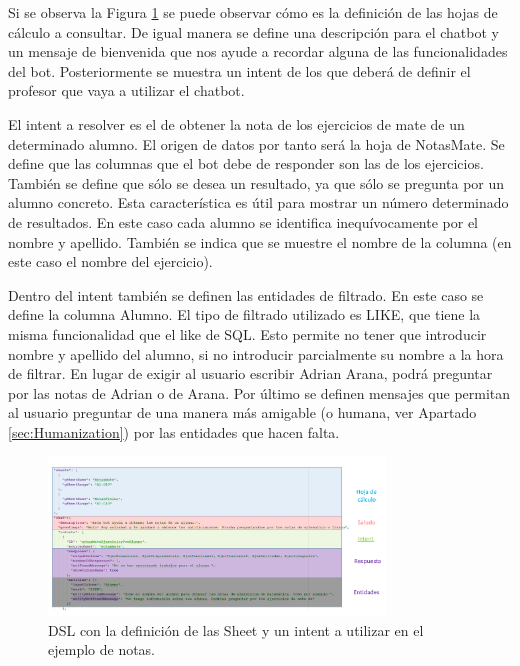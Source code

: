 Si se observa la Figura \ref{fig:DSLNotas} se puede observar cómo es la definición de las hojas de cálculo a consultar. De igual manera se define una descripción para el chatbot y un mensaje de bienvenida que nos ayude a recordar alguna de las funcionalidades del bot. Posteriormente se muestra un intent de los que deberá de definir el profesor que vaya a utilizar el chatbot.

El intent a resolver es el de obtener la nota de los ejercicios de mate de un determinado alumno. El origen de datos por tanto será la hoja de NotasMate. Se define que las columnas que el bot debe de responder son las de los ejercicios. También se define que sólo se desea un resultado, ya que sólo se pregunta por un alumno concreto. Esta característica es útil para mostrar un número determinado de resultados. En este caso cada alumno se identifica inequívocamente por el nombre y apellido. También se indica que se muestre el nombre de la columna (en este caso el nombre del ejercicio).

Dentro del intent también se definen las entidades de filtrado. En este caso se define la columna Alumno. El tipo de filtrado utilizado es LIKE, que tiene la misma funcionalidad que el like de SQL. Esto permite no tener que introducir nombre y apellido del alumno, si no introducir parcialmente su nombre a la hora de filtrar. En lugar de exigir al usuario escribir Adrian Arana, podrá preguntar por las notas de Adrian o de Arana. Por último se definen mensajes que permitan al usuario preguntar de una manera más amigable (o humana, ver Apartado \ref{sec:Humanization}) por las entidades que hacen falta.

\begin{figure}[htb]
	\centering
	\includegraphics[width=0.8\textwidth]{./figs/DSLNotas.png}
	\caption{DSL con la definición de las Sheet y un intent a utilizar en el ejemplo de notas.} %
	\label{fig:DSLNotas}
\end{figure}

